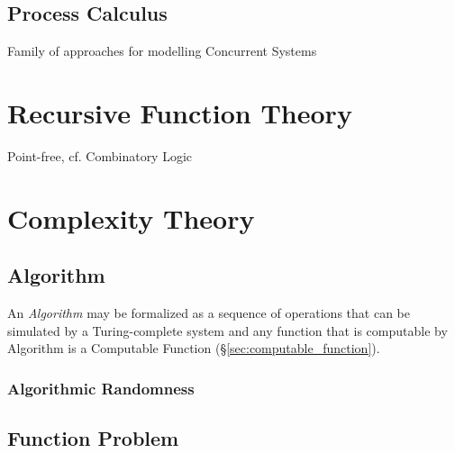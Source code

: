 \subsection{Process Calculus}\label{sec:process_calculus}

Family of approaches for modelling Concurrent Systems



\section{Recursive Function Theory}\label{sec:recursive_function_theory}

Point-free, cf. Combinatory Logic



\section{Complexity Theory}\label{sec:complexity_theory}

\subsection{Algorithm}\label{sec:algorithm}

An \emph{Algorithm} may be formalized as a sequence of operations that
can be simulated by a Turing-complete system and any function that is
computable by Algorithm is a Computable Function
(\S\ref{sec:computable_function}).

\subsubsection{Algorithmic Randomness}\label{sec:algorithmic_randomness}

\subsection{Function Problem}\label{sec:function_problem}

